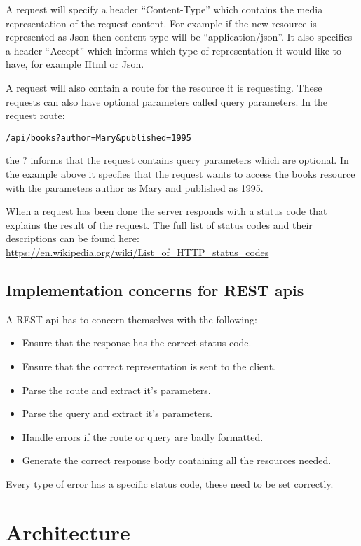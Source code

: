 A request will specify a header ``Content-Type'' which contains the media
representation of the request content. For example if the new resource is
represented as Json then content-type will be ``application/json''. It also
specifies a header ``Accept'' which informs which type of representation it
would like to have, for example Html or Json. 

A request will also contain a route for the resource it is requesting. These
requests can also have optional parameters called query parameters. In the
request route:

\begin{lstlisting}
/api/books?author=Mary&published=1995
\end{lstlisting}

the $?$ informs that the request contains query parameters which are optional.
In the example above it specfies that the request wants to access the books
resource with the parameters author as Mary and published as 1995.

When a request has been done the server responds with a status code that
explains the result of the request. The full list of status codes and their
descriptions can be found here:
\url{https://en.wikipedia.org/wiki/List_of_HTTP_status_codes}

\subsection{Implementation concerns for REST apis}

A REST api has to concern themselves with the following:

\begin{itemize}
\item Ensure that the response has the correct status code.
\item Ensure that the correct representation is sent to the client.
\item Parse the route and extract it's parameters. 
\item Parse the query and extract it's parameters.
\item Handle errors if the route or query are badly formatted.
\item Generate the correct response body containing all the resources needed.
\end{itemize}

Every type of error has a specific status code, these need to be set correctly.

\section{Architecture} 

